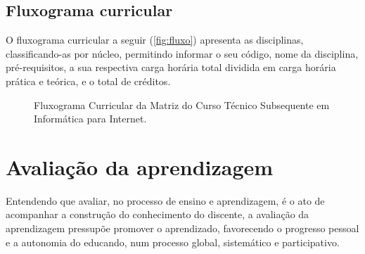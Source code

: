 \documentclass[
	12pt,				%
	openright,			%
	twoside,			%
	a4paper,			%
	chapter=TITLE,		%
	english,			%
	french,				%
	spanish,			%
	brazil,				%
	]{abntex2}
\begin{document}

\section{Fluxograma curricular}

O fluxograma curricular a seguir (\autoref{fig:fluxo}) apresenta as disciplinas, classificando-as por núcleo, permitindo informar o seu código, nome da disciplina, pré-requisitos, a sua respectiva carga horária total dividida em carga horária prática e teórica, e o total de créditos. %

\begin{figure}[htpb]
   \caption{Fluxograma Curricular da Matriz do Curso Técnico Subsequente em Informática para Internet.}
    \label{fig:fluxo}
\end{figure}

\color{black}

\chapter{Avaliação da aprendizagem}

Entendendo que avaliar, no processo de ensino e aprendizagem, é o ato de acompanhar a construção do conhecimento do discente, a avaliação da aprendizagem pressupõe promover o aprendizado, favorecendo o progresso pessoal e a autonomia do educando, num processo global, sistemático e participativo.
\end{document}
